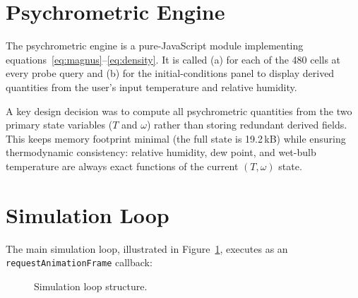 \documentclass[12pt,a4paper]{report}
\begin{document}
\section{Psychrometric Engine}
\label{sec:psych_impl}

The psychrometric engine is a pure-JavaScript module implementing equations~\eqref{eq:magnus}--\eqref{eq:density}. It is called (a) for each of the 480 cells at every probe query and (b) for the initial-conditions panel to display derived quantities from the user's input temperature and relative humidity.

A key design decision was to compute all psychrometric quantities from the two primary state variables ($T$ and $\omega$) rather than storing redundant derived fields. This keeps memory footprint minimal (the full state is 19.2\,kB) while ensuring thermodynamic consistency: relative humidity, dew point, and wet-bulb temperature are always exact functions of the current $(T, \omega)$ state.

\section{Simulation Loop}
\label{sec:simloop}

The main simulation loop, illustrated in Figure~\ref{fig:simloop}, executes as an \texttt{requestAnimationFrame} callback:

\begin{figure}[H]
\centering
{}
\caption{Simulation loop structure.}
\label{fig:simloop}
\end{figure}
\end{document}
